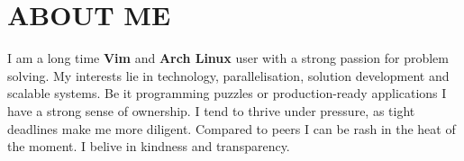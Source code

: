 \documentclass{article}
\begin{document}
\section{ABOUT ME}
I am a long time {\bfseries Vim} and {\bfseries Arch Linux} user with a strong passion for problem solving.
My interests lie in technology, parallelisation, solution development and scalable systems.
Be it programming puzzles or production-ready applications I have a strong sense of ownership.
I tend to thrive under pressure, as tight deadlines make me more diligent.
Compared to peers I can be rash in the heat of the moment.
I belive in kindness and transparency.
\end{document}
